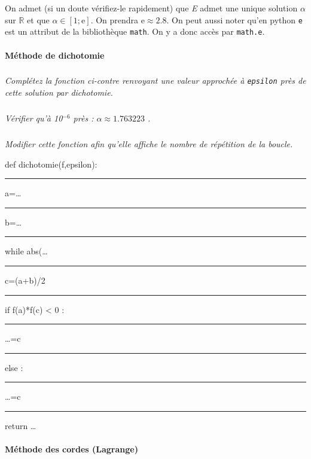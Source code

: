 \documentclass[10pt,oneside]{article}
\begin{document}
On admet (si un doute vérifiez-le rapidement) que \emph{E} admet une unique solution $\alpha$ sur $\mathbb R$ et que
$\alpha\in[1;\text{e}]$. On prendra e$\approx2.8$. On peut aussi noter qu'en python \texttt{e} est un attribut de la bibliothèque \texttt{math}. On y a donc accès par \texttt{math.e}.

\medskip

\paragraph*{Méthode de dichotomie}


\begin{minipage}[c]{.47\linewidth}

\subparagraph{} \textit{Complétez la fonction ci-contre renvoyant une valeur approchée à \texttt{epsilon} près de cette solution par dichotomie.}
\subparagraph{} \textit{Vérifier qu'à 10$^{-6}$ près : $\alpha\approx 1.763223$ .}
\subparagraph{} \textit{Modifier cette fonction afin qu'elle affiche le nombre de répétition de la boucle.}

\end{minipage} \hfill
\begin{minipage}[c]{.47\linewidth}
\begin{py}

\begin{minipage}{\linewidth}
\ttfamily

def dichotomie(f,epsilon):

\rule{4ex}{0pt} a=\ldots

\rule{4ex}{0pt} b=\ldots

\rule{4ex}{0pt} while abs(\ldots

\rule{8ex}{0pt} c=(a+b)/2

\rule{8ex}{0pt} if f(a)*f(c) < 0 :

\rule{12ex}{0pt} \ldots =c

\rule{8ex}{0pt} else :

\rule{12ex}{0pt} \ldots =c

\rule{4ex}{0pt} return \ldots
\end{minipage}

\medskip\normalfont

\end{py}
\end{minipage} 




\paragraph*{Méthode des cordes (Lagrange)}
\end{document}
